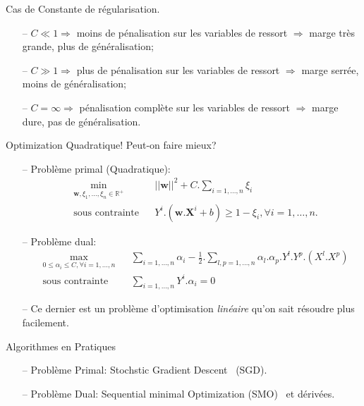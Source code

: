 \documentclass[9pt]{beamer}
\begin{document}
	\begin{frame}{Cas de Constante de régularisation.}
		\begin{itemize}
			\item[--] $C \ll 1 \Longrightarrow$ moins de pénalisation sur les variables de ressort $\Longrightarrow$ marge très grande, plus de généralisation;
			\item[--] $C \gg 1 \Longrightarrow$ plus de pénalisation sur les variables de ressort $\Longrightarrow$ marge serrée, moins de généralisation;
			\item[--] $C=\infty \Longrightarrow$ pénalisation complète sur les variables de ressort $\Longrightarrow$ marge dure, pas de généralisation.
		\end{itemize}
	\end{frame}
	\begin{frame}{Optimization Quadratique! Peut-on faire mieux?}
		\begin{itemize}
			\item[--] Problème primal (Quadratique):
			\begin{equation}
				\begin{aligned}
				& \min_{\textbf{w}, \xi_1,\dots,\xi_n \in \mathbb{R}^+}
				& & {\vert\vert \textbf{w} \vert\vert}^2 + C.\sum_{i=1,\dots,n}\xi_i \\
				& \text{sous contrainte}
				& & Y^i.(\textbf{w}.\textbf{X}^i + b) \geq 1 - \xi_i , \forall i = 1, \dots, n.
				\end{aligned}
			\end{equation}
			\item[--] Problème dual:
			\begin{equation}
				\begin{aligned}
				& \max_{0 \leq \alpha_i \leq C ,\forall i=1,\dots,n}
				& & \sum_{i=1,\dots,n} \alpha_i - \frac{1}{2}.\sum_{l,p=1,\dots,n}\alpha_l.\alpha_p.Y^l.Y^p.(X^l.X^p)\\
				& \text{sous contrainte}
				& & \sum_{i=1,\dots,n}Y^i.\alpha_i=0
				\end{aligned}
			\end{equation}
            \item[--] Ce dernier est un problème d'optimisation \textit{linéaire} qu'on sait résoudre plus facilement.
		\end{itemize}
	\end{frame}
    \begin{frame}{Algorithmes en Pratiques}
		\begin{itemize}
			\item[--] Problème Primal: Stochstic Gradient Descent~\cite{bottou2010} (SGD).
            \item[--] Problème Dual: Sequential minimal Optimization (SMO)~\cite{platt1998sequential} et dérivées.
		\end{itemize}
	\end{frame}
\end{document}
